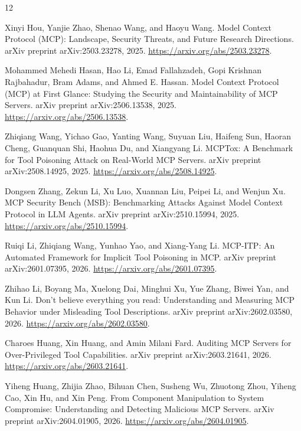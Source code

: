 \documentclass[pdflatex,sn-mathphys-num]{sn-jnl}%
\theoremstyle{thmstyleone}%
\theoremstyle{thmstyletwo}%
\theoremstyle{thmstylethree}%
\begin{document}
\backmatter

\renewcommand{\refname}{Vorl\"aufiges Literaturverzeichnis}
\renewcommand{\bibname}{Vorl\"aufiges Literaturverzeichnis}
\begin{thebibliography}{12}

Xinyi Hou, Yanjie Zhao, Shenao Wang, and Haoyu Wang.
\newblock Model Context Protocol (MCP): Landscape, Security Threats, and Future Research Directions.
\newblock arXiv preprint arXiv:2503.23278, 2025. \url{https://arxiv.org/abs/2503.23278}.

Mohammed Mehedi Hasan, Hao Li, Emad Fallahzadeh, Gopi Krishnan Rajbahadur, Bram Adams, and Ahmed E. Hassan.
\newblock Model Context Protocol (MCP) at First Glance: Studying the Security and Maintainability of MCP Servers.
\newblock arXiv preprint arXiv:2506.13538, 2025. \url{https://arxiv.org/abs/2506.13538}.

Zhiqiang Wang, Yichao Gao, Yanting Wang, Suyuan Liu, Haifeng Sun, Haoran Cheng, Guanquan Shi, Haohua Du, and Xiangyang Li.
\newblock MCPTox: A Benchmark for Tool Poisoning Attack on Real-World MCP Servers.
\newblock arXiv preprint arXiv:2508.14925, 2025. \url{https://arxiv.org/abs/2508.14925}.

Dongsen Zhang, Zekun Li, Xu Luo, Xuannan Liu, Peipei Li, and Wenjun Xu.
\newblock MCP Security Bench (MSB): Benchmarking Attacks Against Model Context Protocol in LLM Agents.
\newblock arXiv preprint arXiv:2510.15994, 2025. \url{https://arxiv.org/abs/2510.15994}.

Ruiqi Li, Zhiqiang Wang, Yunhao Yao, and Xiang-Yang Li.
\newblock MCP-ITP: An Automated Framework for Implicit Tool Poisoning in MCP.
\newblock arXiv preprint arXiv:2601.07395, 2026. \url{https://arxiv.org/abs/2601.07395}.

Zhihao Li, Boyang Ma, Xuelong Dai, Minghui Xu, Yue Zhang, Biwei Yan, and Kun Li.
\newblock Don't believe everything you read: Understanding and Measuring MCP Behavior under Misleading Tool Descriptions.
\newblock arXiv preprint arXiv:2602.03580, 2026. \url{https://arxiv.org/abs/2602.03580}.

Charoes Huang, Xin Huang, and Amin Milani Fard.
\newblock Auditing MCP Servers for Over-Privileged Tool Capabilities.
\newblock arXiv preprint arXiv:2603.21641, 2026. \url{https://arxiv.org/abs/2603.21641}.

Yiheng Huang, Zhijia Zhao, Bihuan Chen, Susheng Wu, Zhuotong Zhou, Yiheng Cao, Xin Hu, and Xin Peng.
\newblock From Component Manipulation to System Compromise: Understanding and Detecting Malicious MCP Servers.
\newblock arXiv preprint arXiv:2604.01905, 2026. \url{https://arxiv.org/abs/2604.01905}.


\end{thebibliography}
\end{document}
